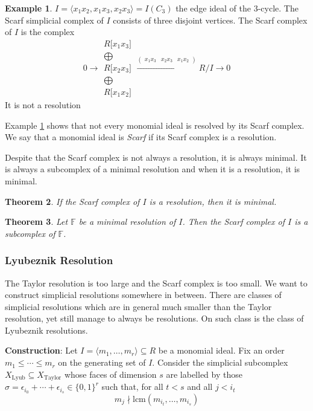 \documentclass[paper=a4, fontsize=11pt]{scrartcl} %
\theoremstyle{plain}
\newtheorem{thm}{Theorem}[section]
\theoremstyle{definition}
\newtheorem{exmp}[thm]{Example}
\begin{document}
\begin{exmp} \label{ex:scarf not resolution}
$I = \langle x_{1} x_{2}, x_{1} x_{3}, x_{2} x_{3} \rangle = I(C_3)$ the edge ideal of the 3-cycle. The Scarf simplicial complex of $I$ consists of three disjoint vertices. The Scarf complex of $I$ is the complex $$
0 \rightarrow \begin{matrix}
R \lbrack x_{1}x_{3} \rbrack \\ \bigoplus \\
R \lbrack x_{2}x_{3} \rbrack \\ \bigoplus \\
R \lbrack x_{1}x_{2} \rbrack
\end{matrix}
\xrightarrow{\left( \begin{matrix}
x_{1}x_{3} & x_{2}x_{3} & x_{1}x_{2}
\end{matrix} \right)} R/I \rightarrow 0
$$
It is not a resolution
\end{exmp}

Example \ref{ex:scarf not resolution} shows that not every monomial ideal is resolved by its Scarf complex. We say that a monomial ideal is \textit{Scarf} if its Scarf complex is a resolution.

Despite that the Scarf complex is not always a resolution, it is always minimal. It is always a subcomplex of a minimal resolution and when it is a resolution, it is minimal.

\begin{thm} \cite[Theorem 5.5]{Me11}
If the Scarf complex of $I$ is a resolution, then it is minimal.
\end{thm}

\begin{thm} \cite[Theorem 5.6]{Me11}
Let $\mathbb{F}$ be a minimal resolution of $I$. Then the Scarf complex of $I$ is a subcomplex of $\mathbb{F}$.
\end{thm}



\subsubsection{Lyubeznik Resolution}
The Taylor resolution is too large and the Scarf complex is too small. We want to construct simplicial resolutions somewhere in between. There are classes of simplicial resolutions which are in general much smaller than the Taylor resolution, yet still manage to always be resolutions. On such class is the class of Lyubeznik resolutions.

\textbf{Construction}: Let $I = \langle m_1, \dots, m_r \rangle \subseteq R$ be a monomial ideal. Fix an order $m_1 \leq \cdots \leq m_r$  on the generating set of $I$. Consider the simplicial subcomplex $X_{\text{Lyub}} \subseteq X_{\text{Taylor}}$ whose faces of dimension $s$ are labelled by those $\sigma = \epsilon_{i_0} + \cdots + \epsilon_{i_s} \in \lbrace 0,1 \rbrace^r$ such that, for all $t<s$ and all $j<i_t$ $$ m_j \nmid \text{lcm} (m_{i_t}, \dots , m_{i_s})$$
\end{document}
